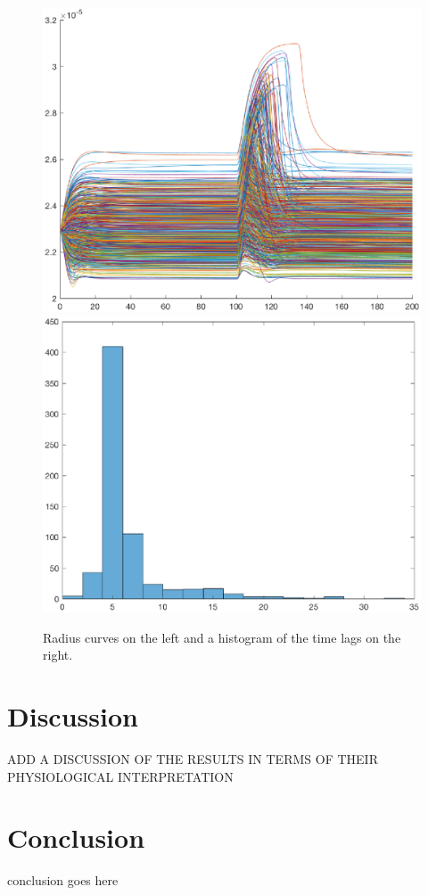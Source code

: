 \documentclass[12pt]{article}
\numberwithin{equation}{section}
\begin{document}
\begin{figure}[h]
\centering
\includegraphics[width=.49 \textwidth]{Figures/Radius_Curves.eps}
\includegraphics[width=.49 \textwidth]{Figures/Radius_Time_Lag_Histogram.eps}
\caption{Radius curves on the left and a histogram of the time lags on the right.}
\end{figure}

\section{Discussion}
ADD A DISCUSSION OF THE RESULTS IN TERMS OF THEIR PHYSIOLOGICAL INTERPRETATION

\section{Conclusion}
conclusion goes here


\end{document}
